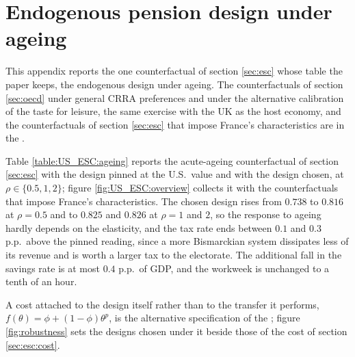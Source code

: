 \FloatBarrier
\section{Endogenous pension design under ageing}\label{app:US:escTables}\setcounter{equation}{0}
This appendix reports the one counterfactual of section \ref{sec:esc} whose table the paper keeps, the endogenous design under ageing. The counterfactuals of section \ref{sec:oecd} under general CRRA preferences and under the alternative calibration of the taste for leisure, the same exercise with the UK as the host economy, and the counterfactuals of section \ref{sec:esc} that impose France's characteristics are in the .

Table \ref{table:US_ESC:ageing} reports the acute-ageing counterfactual of section \ref{sec:esc} with the design pinned at the U.S.\ value and with the design chosen, at $\rho \in \{0.5, 1, 2\}$; figure \ref{fig:US_ESC:overview} collects it with the counterfactuals that impose France's characteristics. The chosen design rises from $0.738$ to $0.816$ at $\rho = 0.5$ and to $0.825$ and $0.826$ at $\rho = 1$ and $2$, so the response to ageing hardly depends on the elasticity, and the tax rate ends between $0.1$ and $0.3$ p.p.\ above the pinned reading, since a more Bismarckian system dissipates less of its revenue and is worth a larger tax to the electorate. The additional fall in the savings rate is at most $0.4$ p.p.\ of GDP, and the workweek is unchanged to a tenth of an hour.



A cost attached to the design itself rather than to the transfer it performs, $f(\theta) = \phi + (1-\phi)\theta^{p}$, is the alternative specification of the ; figure \ref{fig:robustness} sets the designs chosen under it beside those of the cost of section \ref{sec:esc:cost}.
